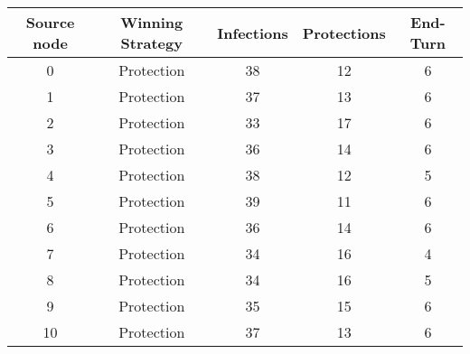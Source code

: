 \documentclass[results.tex]{subfiles}
\begin{document}
    \begin{center}
        \begin{tabular}{| c || c | c | c | c |}
            \hline
            {\bfseries Source node} & {\bfseries Winning Strategy} & {\bfseries Infections} & {\bfseries Protections}
            & {\bfseries End-Turn}
            \\  %
            \hline\hline
            0                       & Protection                   & 38                     & 12                      & 6                    \\
            \hline
            1                       & Protection                   & 37                     & 13                      & 6                    \\
            \hline
            2                       & Protection                   & 33                     & 17                      & 6                    \\
            \hline
            3                       & Protection                   & 36                     & 14                      & 6                    \\
            \hline
            4                       & Protection                   & 38                     & 12                      & 5                    \\
            \hline
            5                       & Protection                   & 39                     & 11                      & 6                    \\
            \hline
            6                       & Protection                   & 36                     & 14                      & 6                    \\
            \hline
            7                       & Protection                   & 34                     & 16                      & 4                    \\
            \hline
            8                       & Protection                   & 34                     & 16                      & 5                    \\
            \hline
            9                       & Protection                   & 35                     & 15                      & 6                    \\
            \hline
            10                      & Protection                   & 37                     & 13                      & 6                    \\

\end{tabular}
\end{center}
\end{document}
